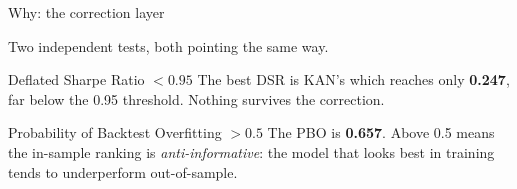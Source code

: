 \documentclass[aspectratio=169, t]{beamer}
\begin{document}
\begin{frame}{Why: the correction layer}
\vspace{-0.4em}

\centering
{\footnotesize Two independent tests, both pointing the same way.}

\vspace{0.9em}

{
\begin{block}{Deflated Sharpe Ratio $< 0.95$}
\footnotesize
The best DSR is KAN's which reaches only \textbf{0.247}, far below the 0.95 threshold. Nothing survives the correction.
\end{block}
}

\vspace{0.7em}

{
\begin{block}{Probability of Backtest Overfitting $> 0.5$}
\footnotesize
The PBO is \textbf{0.657}. Above 0.5 means the in-sample ranking is \emph{anti-informative}: the model that looks best in training tends to underperform out-of-sample.
\end{block}
}

\end{frame}
\end{document}
